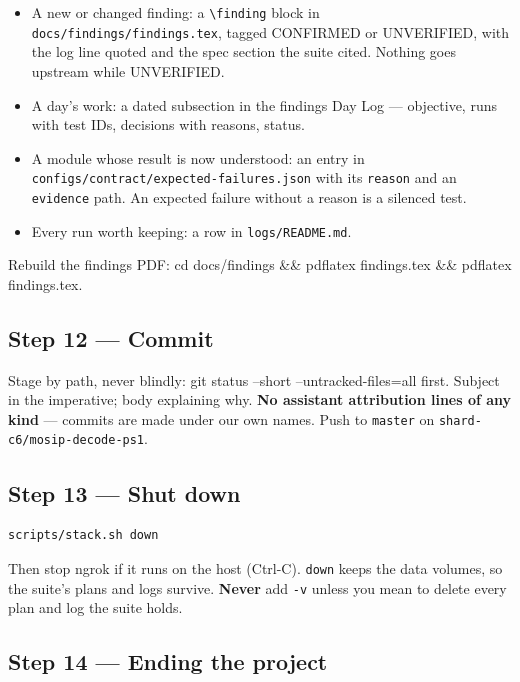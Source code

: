 \documentclass[10pt,a4paper]{article}
\newcommand{\tightlist}{\setlength{\itemsep}{1pt}\setlength{\parskip}{0pt}\setlength{\parsep}{0pt}}
\newcommand{\cmd}[1]{\colorbox{box}{#1}}
\begin{document}
\begin{itemize}\tightlist
  \item A new or changed finding: a \texttt{\textbackslash finding} block in
        \texttt{docs/findings/findings.tex}, tagged CONFIRMED or UNVERIFIED, with the log
        line quoted and the spec section the suite cited. Nothing goes upstream while
        UNVERIFIED.
  \item A day's work: a dated subsection in the findings Day Log --- objective, runs
        with test IDs, decisions with reasons, status.
  \item A module whose result is now understood: an entry in
        \texttt{configs/contract/expected-failures.json} with its \texttt{reason} and an
        \texttt{evidence} path. An expected failure without a reason is a silenced test.
  \item Every run worth keeping: a row in \texttt{logs/README.md}.
\end{itemize}

Rebuild the findings PDF: \cmd{cd docs/findings \&\& pdflatex findings.tex \&\& pdflatex
findings.tex}.

\subsection{Step 12 --- Commit}

Stage by path, never blindly: \cmd{git status --short --untracked-files=all} first.
Subject in the imperative; body explaining why. \textbf{No assistant attribution lines of
any kind} --- commits are made under our own names. Push to \texttt{master} on
\texttt{shard-c6/mosip-decode-ps1}.

\subsection{Step 13 --- Shut down}

\begin{verbatim}
scripts/stack.sh down
\end{verbatim}

Then stop ngrok if it runs on the host (Ctrl-C). \texttt{down} keeps the data volumes, so the
suite's plans and logs survive. \textbf{Never} add \texttt{-v} unless you mean to delete every
plan and log the suite holds.

\subsection{Step 14 --- Ending the project}
\end{document}
